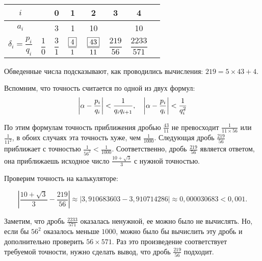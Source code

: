 \documentclass{article}
\begin{document}
\begin{center}
\begin{tabular}{c|c|c|c|c|c|c|c}
$i$&&0&1&2&3&4\\
\hline
\rule{0pt}{12pt}$a_i$&&3&1&10&\raisebox{1pt}{\fbox5}&10\\
\hline
\rule{0pt}{18pt} $\delta_i=\dfrac{p_i}{q_i}$&$\dfrac10$&$\dfrac31$&$\dfrac{\fbox4}1$&$\dfrac{\fbox{43}}{11}$&$\dfrac{219}{56}$&$\dfrac{2233}{571}$
\end{tabular}
\end{center}

Обведенные числа подсказывают, как проводились вычисления: $219 = 5\times43 + 4$.

Вспомним, что точность считается по одной из двух формул:
$$\left|\alpha-\dfrac{p_i}{q_i}\right|<\dfrac{1}{q_iq_{i+1}},\hskip 1em
\left|\alpha-\dfrac{p_i}{q_i}\right|<\dfrac{1}{q_i^2}$$

По этим формулам точность приближения дробью $\frac{43}{11}$ не превосходит $\frac{1}{11\times56}$ или $\frac{1}{11^2}$, в обоих случаях эта точность хуже, чем $\frac{1}{1000}$. Следующая дробь $\frac{219}{56}$ приближает с точностью $\frac1{56^2}<\frac1{1000}$. Соответственно, дробь $\frac{219}{56}$ является ответом, она приближаешь исходное число $\frac{10+\sqrt3}{3}$ с нужной точностью.

Проверим точность на калькуляторе:

$$\left|\frac{10+\sqrt3}{3}-\frac{219}{56}\right|\approx
|3,910683603-3,910714286|\approx0,000030683<0,001.$$

Заметим, что дробь $\frac{2233}{571}$ оказалась ненужной, ее можно было не вычислять. Но, если бы $56^2$ оказалось меньше $1000$, можно было бы вычислить эту дробь и дополнительно проверить $56\times571$. Раз это произведение соответствует требуемой точности, нужно сделать вывод, что дробь $\frac{219}{56}$ подходит.
\end{document}
